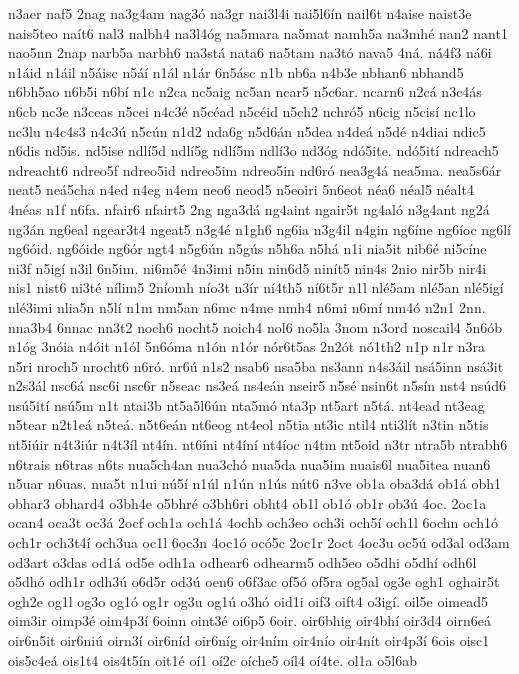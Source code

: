 {n3aer
naf5
2nag
na3g4am
nag3ó
na3gr
nai3l4i
nai5l6ín
nail6t
n4aise
naist3e
nais5teo
naít6
nal3
nalbh4
na3l4óg
na5mara
na5mat
namh5a
na3mhé
nan2
nant1
nao5nn
2nap
narb5a
narbh6
na3stá
nata6
na5tam
na3tó
nava5
4ná.
ná4f3
ná6i
n1áid
n1áil
n5áisc
n5áí
n1ál
n1ár
6n5ásc
n1b
nb6a
n4b3e
nbhan6
nbhand5
n6bh5ao
n6b5i
n6bí
n1c
n2ca
nc5aig
nc5an
ncar5
n5c6ar.
ncarn6
n2cá
n3c4ás
n6cb
nc3e
n3ceas
n5cei
n4c3é
n5céad
n5céid
n5ch2
nchró5
n6cig
n5cisí
nc1lo
nc3lu
n4c4s3
n4c3ú
n5cún
n1d2
nda6g
n5d6án
n5dea
n4deá
n5dé
n4diai
ndic5
n6dis
nd5is.
nd5ise
ndlí5d
ndlí5g
ndlí5m
ndlí3o
nd3óg
ndó5ite.
ndó5ití
ndreach5
ndreacht6
ndreo5f
ndreo5id
ndreo5im
ndreo5in
nd6ró
nea3g4á
nea5ma.
nea5s6ár
neat5
neá5cha
n4ed
n4eg
n4em
neo6
neod5
n5eoiri
5n6eot
néa6
néal5
néalt4
4néas
n1f
n6fa.
nfair6
nfairt5
2ng
nga3dá
ng4aint
ngair5t
ng4aló
n3g4ant
ng2á
ng3án
ng6eal
ngear3t4
ngeat5
n3g4é
n1gh6
ng6ia
n3g4il
n4gin
ng6íne
ng6íoc
ng6lí
ng6óid.
ng6óide
ng6ór
ngt4
n5g6ún
n5gús
n5h6a
n5há
n1i
nia5it
nib6é
ni5cíne
ni3f
n5igí
n3il
6n5im.
ni6m5é
4n3imi
n5in
nin6d5
ninít5
nin4s
2nio
nir5b
nir4i
nis1
nist6
ni3té
nílim5
2níomh
nío3t
n3ír
ní4th5
ní6t5r
n1l
nlé5am
nlé5an
nlé5igí
nlé3imi
nlia5n
n5lí
n1m
nm5an
n6mc
n4me
nmh4
n6mi
n6mí
nm4ó
n2n1
2nn.
nna3b4
6nnac
nn3t2
noch6
nocht5
noich4
nol6
no5la
3nom
n3ord
noscail4
5n6ób
n1óg
3nóia
n4óit
n1ól
5n6óma
n1ón
n1ór
nór6t5as
2n2ót
nó1th2
n1p
n1r
n3ra
n5ri
nroch5
nrocht6
n6ró.
nr6ú
n1s2
nsab6
nsa5ba
ns3ann
n4s3áil
nsá5inn
nsá3it
n2s3ál
nsc6á
nsc6i
nsc6r
n5seac
ns3eá
ns4eán
nseir5
n5sé
nsin6t
n5sín
nst4
nsúd6
nsú5ití
nsú5m
n1t
ntai3b
nt5a5l6ún
nta5mó
nta3p
nt5art
n5tá.
nt4ead
nt3eag
n5tear
n2t1eá
n5teá.
n5t6eán
nt6eog
nt4eol
n5tia
nt3ic
ntil4
nti3lít
n3tin
n5tis
nt5iúir
n4t3iúr
n4t3íl
nt4ín.
nt6íni
nt4íní
nt4íoc
n4tm
nt5oid
n3tr
ntra5b
ntrabh6
n6trais
n6tras
n6ts
nua5ch4an
nua3chó
nua5da
nua5im
nuais6l
nua5itea
nuan6
n5uar
n6uas.
nua5t
n1ui
nú5í
n1úl
n1ún
n1ús
nút6
n3ve
ob1a
oba3dá
ob1á
obh1
obhar3
obhard4
o3bh4e
o5bhré
o3bh6ri
obht4
ob1l
ob1ó
ob1r
ob3ú
4oc.
2oc1a
ocan4
oca3t
oc3á
2ocf
och1a
och1á
4ochb
och3eo
och3i
och5í
och1l
6ochn
och1ó
och1r
och3t4í
och3ua
oc1l
6oc3n
4oc1ó
ocó5c
2oc1r
2oct
4oc3u
oc5ú
od3al
od3am
od3art
o3das
od1á
od5e
odh1a
odhear6
odhearm5
odh5eo
o5dhi
o5dhí
odh6l
o5dhó
odh1r
odh3ú
o6d5r
od3ú
oen6
o6f3ac
of5ó
of5ra
og5al
og3e
ogh1
oghair5t
ogh2e
og1l
og3o
og1ó
og1r
og3u
og1ú
o3hó
oid1i
oif3
oift4
o3igí.
oil5e
oimead5
oim3ir
oimp3é
oim4p3í
6oinn
oint3é
oi6p5
6oir.
oir6bhig
oir4bhí
oir3d4
oirn6eá
oir6n5it
oir6niú
oirn3í
oir6níd
oir6níg
oir4ním
oir4nío
oir4nít
oir4p3í
6ois
oisc1
ois5c4eá
ois1t4
ois4t5ín
oit1é
oí1
oí2c
oíche5
oíl4
oí4te.
ol1a
o5l6ab
}
